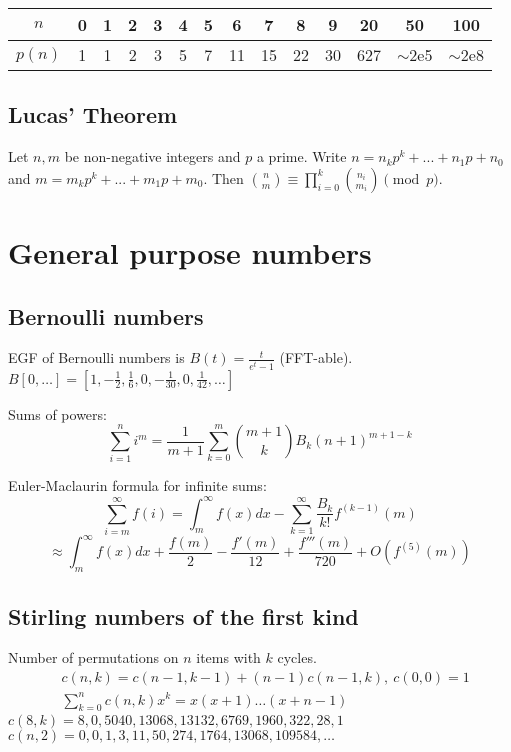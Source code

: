 		\begin{center}
		\begin{tabular}{c|c@{\ }c@{\ }c@{\ }c@{\ }c@{\ }c@{\ }c@{\ }c@{\ }c@{\ }c@{\ }c@{\ }c@{\ }c}
			$n$    & 0 & 1 & 2 & 3 & 4 & 5 & 6  & 7  & 8  & 9  & 20  & 50  & 100 \\ \hline
			$p(n)$ & 1 & 1 & 2 & 3 & 5 & 7 & 11 & 15 & 22 & 30 & 627 & $\mathtt{\sim}$2e5 & $\mathtt{\sim}$2e8 \\
		\end{tabular}
		\end{center}

	\subsection{Lucas' Theorem}
		Let $n,m$ be non-negative integers and $p$ a prime. Write $n=n_kp^k+...+n_1p+n_0$ and $m=m_kp^k+...+m_1p+m_0$. Then $\binom{n}{m} \equiv \prod_{i=0}^k\binom{n_i}{m_i} \pmod{p}$.

\section{General purpose numbers}
	\subsection{Bernoulli numbers}
		EGF of Bernoulli numbers is $B(t)=\frac{t}{e^t-1}$ (FFT-able).
		$B[0,\ldots] = [1, -\frac{1}{2}, \frac{1}{6}, 0, -\frac{1}{30}, 0, \frac{1}{42}, \ldots]$

		Sums of powers:
		\small
		\[ \sum_{i=1}^n i^m = \frac{1}{m+1} \sum_{k=0}^m \binom{m+1}{k} B_k (n+1)^{m+1-k} \]
		\normalsize

		Euler-Maclaurin formula for infinite sums:
		\small
		\[ \sum_{i=m}^{\infty} f(i) = \int_m^\infty f(x) dx - \sum_{k=1}^\infty \frac{B_k}{k!}f^{(k-1)}(m) \]
		\[ \approx \int_{m}^\infty f(x)dx + \frac{f(m)}{2} - \frac{f'(m)}{12} + \frac{f'''(m)}{720} + O(f^{(5)}(m)) \]
		\normalsize

	\subsection{Stirling numbers of the first kind}
		Number of permutations on $n$ items with $k$ cycles.
		\begin{align*}
			&c(n,k) = c(n-1,k-1) + (n-1) c(n-1,k),\ c(0,0) = 1 \\
			&\textstyle \sum_{k=0}^n c(n,k)x^k = x(x+1) \dots (x+n-1)
		\end{align*}
		$c(8,k) = 8, 0, 5040, 13068, 13132, 6769, 1960, 322, 28, 1$ \\
		$c(n,2) = 0, 0, 1, 3, 11, 50, 274, 1764, 13068, 109584, \dots$

